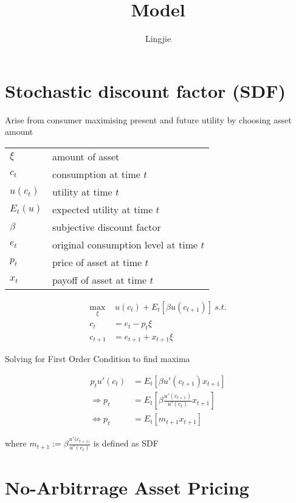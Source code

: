 \documentclass[11pt, oneside]{article}   	%
\title{Model}
\author{Lingjie}
\begin{document}
\maketitle

\section{Stochastic discount factor (SDF)}

Arise from consumer maximising present and future utility by choosing asset amount

\begin{tabular}{l @{ := } l}
    $\xi$ & amount of asset \\
    $c_t$ & consumption at time $t$ \\
    $u(c_t)$ & utility at time $t$ \\
    $E_t(u)$ & expected utility at time $t$ \\
    $\beta$ & subjective discount factor \\
    $e_t$ & original consumption level at time $t$ \\
    $p_t$ & price of asset at time $t$ \\
    $x_t$ & payoff of asset at time $t$
\end{tabular}

\begin{align*}
    \max_{\xi} & ~u(c_t) + E_t\left[ \beta u(c_{t+1}) \right]~s.t.\\
    c_t &= e_t - p_t\xi \\
    c_{t+1} &= e_{t+1} + x_{t+1}\xi
\end{align*}

Solving for First Order Condition to find maxima

\begin{align*}
    p_tu'(c_t) &= E_t\left[ \beta u'(c_{t+1}) x_{t+1}  \right]\\
    \Rightarrow p_t &= E_t\left[ \beta \frac{u'(c_{t+1})}{u'(c_t)} x_{t+1}  \right] \\
    \Leftrightarrow p_t &= E_t \left[ m_{t+1} x_{t+1}  \right]
\end{align*}

where $m_{t+1}:=\beta\frac{u'(c_{t+1)}}{u'(c_t)}$ is defined as SDF

\section{No-Arbitrrage Asset Pricing}
\end{document}
